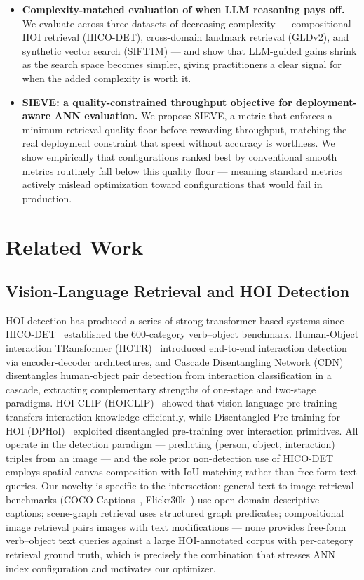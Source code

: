 \documentclass[sigconf, nonacm]{acmart}
\theoremstyle{definition}
\begin{document}
\begin{itemize}[leftmargin=1em, itemsep=1pt, topsep=1pt]
  \item \textbf{Complexity-matched evaluation of when LLM reasoning pays off.}
    We evaluate across three datasets of decreasing complexity ---
    compositional HOI retrieval (HICO-DET), cross-domain landmark retrieval
    (GLDv2), and synthetic vector search (SIFT1M) --- and show that LLM-guided
    gains shrink as the search space becomes simpler, giving practitioners a
    clear signal for when the added complexity is worth it.

  \item \textbf{SIEVE: a quality-constrained throughput objective for
    deployment-aware ANN evaluation.}
    We propose SIEVE, a metric that enforces a minimum retrieval quality floor
    before rewarding throughput, matching the real deployment constraint that
    speed without accuracy is worthless.
    We show empirically that configurations ranked best by conventional smooth
    metrics routinely fall below this quality floor --- meaning standard metrics
    actively mislead optimization toward configurations that would fail in
    production.
\end{itemize}

\section{Related Work}
\label{sec:related}

\subsection{Vision-Language Retrieval and HOI Detection}
HOI detection has produced a series of strong transformer-based systems since
HICO-DET~\cite{chao2018hico} established the 600-category verb--object benchmark.
Human-Object interaction TRansformer (HOTR)~\cite{kim2021hotr} introduced end-to-end interaction detection via encoder-decoder
architectures, and Cascade Disentangling Network (CDN)~\cite{zhang2021cdn} disentangles human-object pair detection from interaction
classification in a cascade, extracting complementary strengths of one-stage and two-stage paradigms.
HOI-CLIP (HOICLIP)~\cite{ning2023hoiclip} showed that vision-language pre-training transfers
interaction knowledge efficiently, while Disentangled Pre-training for HOI (DPHoI)~\cite{li2024dphoi} exploited disentangled
pre-training over interaction primitives.
All operate in the detection paradigm --- predicting (person, object, interaction)
triples from an image --- and the sole prior non-detection use of
HICO-DET~\cite{kilickaya2021structured} employs spatial canvas composition with IoU
matching rather than free-form text queries.
Our novelty is specific to the intersection: general text-to-image retrieval benchmarks
(COCO Captions~\cite{chen2015coco}, Flickr30k~\cite{young2014flickr}) use open-domain descriptive captions; scene-graph retrieval
uses structured graph predicates; compositional image retrieval pairs images with
text modifications --- none provides free-form verb--object text queries against a
large HOI-annotated corpus with per-category retrieval ground truth, which is precisely
the combination that stresses ANN index configuration and motivates our optimizer.
\end{document}
